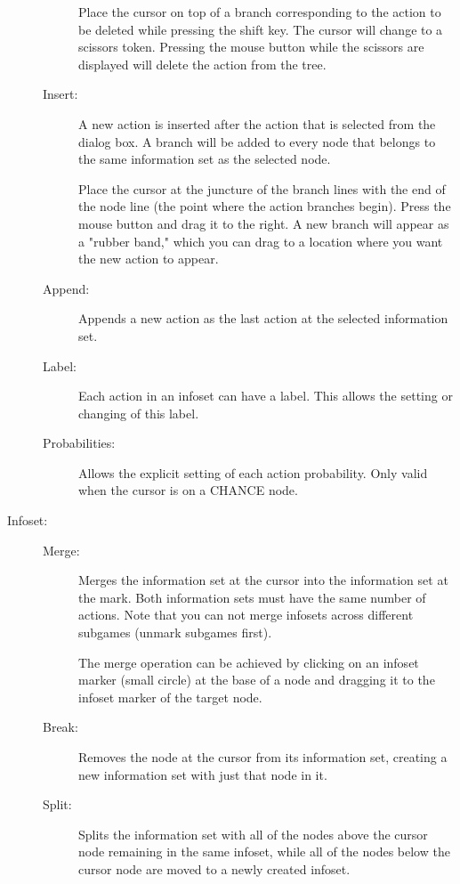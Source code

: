 \begin{description}
\begin{description}
 Place the cursor on top of a
branch corresponding to the action to be deleted while pressing the
shift key.  The cursor will change to a scissors token.  Pressing the
mouse button while the scissors are displayed will delete the action
from the tree.
\item[Insert:] A new action is inserted after the action that is
selected from the dialog box.  A branch will be added to every node
that belongs to the same information set as the selected node.

 Place the cursor at the juncture
of the branch lines with the end of the node line (the point where the
action branches begin).  Press the mouse button and drag it to the
right.  A new branch will appear as a "rubber band," which you can
drag to a location where you want the new action to appear.
\item[Append:] Appends a new action as the last action at the selected
information set.
\item[Label:] Each action in an infoset can have a label.  This allows
the setting or changing of this label.
\item[Probabilities:] Allows the explicit setting of each action
probability.  Only valid when the cursor is on a CHANCE node.
\end{description}

\item[Infoset:]
\begin{description}
\item[Merge:] Merges the information set at the cursor into the
information set at the mark.  Both information sets must have the same
number of actions.  Note that you can not merge infosets across
different subgames (unmark subgames first).

 The merge operation can be
achieved by clicking on an infoset marker (small circle) at the base
of a node and dragging it to the infoset marker of the target node.
\item[Break:] Removes the node at the cursor from its information set,
creating a new information set with just that node in it.
\item[Split:] Splits the information set with all of the nodes above the
cursor node remaining in the same infoset, while all of the nodes
below the cursor node are moved to a newly created infoset.


\end{description}
\end{description}
